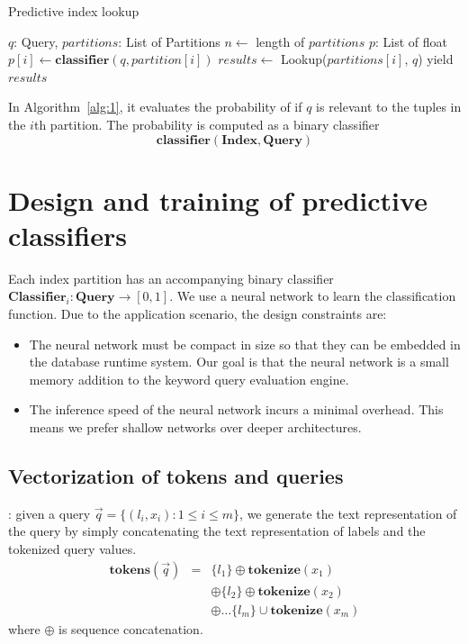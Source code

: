 \documentclass[conference]{IEEEtran}
\begin{document}
\begin{algorithm}
\caption{Predictive index lookup}
\begin{algorithmic}[1]
\REQUIRE $q$: Query, $partitions$: List of Partitions
\STATE $n \leftarrow$ length of $partitions$
\STATE $p$: List of float
  \STATE $p[i] \leftarrow \mathbf{classifier}(q, partition[i])$
\ENDFOR
{}
    \STATE $results \leftarrow$ Lookup($partitions[i]$, $q$)
    \STATE yield $results$
\ENDFOR
\end{algorithmic}
\label{alg:1}
\end{algorithm}

In Algorithm~\ref{alg:1}, it evaluates the probability of if $q$
is relevant to the tuples in the $i$th partition.  The probability
is computed as a binary classifier 
$$\mathbf{classifier}(\mathbf{Index}, \mathbf{Query})$$

\section{Design and training of predictive classifiers}

Each index partition has an accompanying binary classifier $\mathbf{Classifier}_i : \mathbf{Query}\to[0, 1]$.
We use a neural network to learn the classification function.  Due to the application
scenario, the design constraints are:

\begin{itemize}
\item The neural network must be compact in size so that they can be embedded in
	the database runtime system.  Our goal is that the neural network is a small
	memory addition to the keyword query evaluation engine.
\item The inference speed of the neural network incurs a minimal overhead.  This means
	we prefer shallow networks over deeper architectures.
\end{itemize}

\subsection{Vectorization of tokens and queries}

:  given a query $\vec q=\{(l_i,
x_i): 1\leq i \leq m\}$, we generate the text representation of the query by
simply concatenating the text representation of labels and the tokenized query
values.
\begin{eqnarray*}
	\mathbf{tokens}(\vec q) &=& \{l_1\} \oplus \mathbf{tokenize}(x_1)  \\
				&&  \oplus \{l_2\} \oplus \mathbf{tokenize}(x_2) \\
				&& \oplus \dots \{l_m\} \cup \mathbf{tokenize}(x_m)
\end{eqnarray*}
where $\oplus$ is sequence concatenation.
\end{document}
